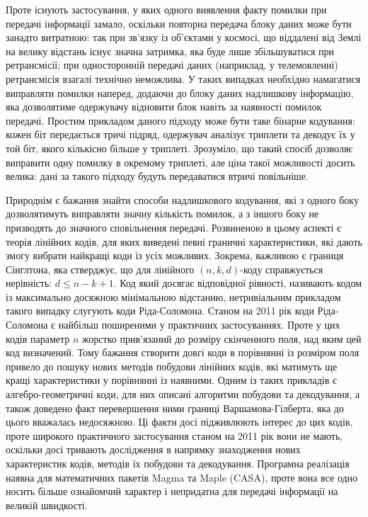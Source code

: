 \documentclass[a4paper,12pt,oneside]{article}
\begin{document}
Проте існують застосування, у яких одного виявлення факту помилки при передачі інформації замало, оскільки повторна передача блоку даних може бути занадто витратною: 
так при зв'язку із об'єктами у космосі, що віддалені від Землі на велику відстань існує значна затримка, яка буде лише збільшуватися при ретрансмісії; 
при односторонній передачі даних (наприклад, у телемовленні) ретрансмісія взагалі технічно неможлива. 
У таких випадках необхідно намагатися виправляти помилки наперед, додаючи до блоку даних надлишкову інформацію, яка дозволятиме одержувачу відновити блок навіть за наявності помилок передачі. 
Простим прикладом даного підходу може бути таке бінарне кодування: кожен біт передається тричі підряд, одержувач аналізує триплети та декодує їх у той біт, якого кількісно більше у триплеті. 
Зрозуміло, що такий спосіб дозволяє виправити одну помилку в окремому триплеті, але ціна такої можливості досить велика: дані за такого підходу будуть передаватися втричі повільніше.

Природнім є бажання знайти способи надлишкового кодування, які з одного боку дозволятимуть виправляти значну кількість помилок, а з іншого боку не призводять до значного сповільнення передачі. 
Розвиненою в цьому аспекті є теорія лінійних кодів,  для яких виведені певні граничні характеристики, які дають змогу вибрати найкращі коди із усіх можливих. 
Зокрема, важливою є границя Сінглтона, яка стверджує, що для лінійного $(n, k, d)$-коду справжується нерівність: $d \le n-k+1$. 
Код який досягає відповідної рівності, називають кодом із максимально досяжною мінімальною відстанню, нетривіальним прикладом такого випадку слугують коди Ріда-Соломона.
Станом на 2011 рік коди Ріда-Соломона є найбільш поширеними у практичних застосуваннях. Проте у цих кодів параметр $n$ жорстко прив'язаний до розміру скінченного поля, над яким цей код визначений.
Тому бажання створити довгі коди в порівнянні із розміром поля привело до пошуку нових методів побудови лінійних кодів, які матимуть ще кращі характеристики у порівнянні із наявними.
Одним із таких прикладів є алгебро-геометричні коди, для них описані алгоритми побудови та декодування, а також доведено факт перевершення ними границі Варшамова-Гілберта, яка до цього вважалась недосяжною.
Ці факти досі підживлюють інтерес до цих кодів, проте широкого практичного застосування станом на 2011 рік вони не мають, оскільки досі тривають дослідження в напрямку знаходження нових характеристик кодів, методів їх побудови та декодування. Програмна реалізація наявна для математичних пакетів Magma та Maple (CASA), проте вона все одно носить більше ознайомчий характер і непридатна для передачі інформації на великій швидкості.
\end{document}
